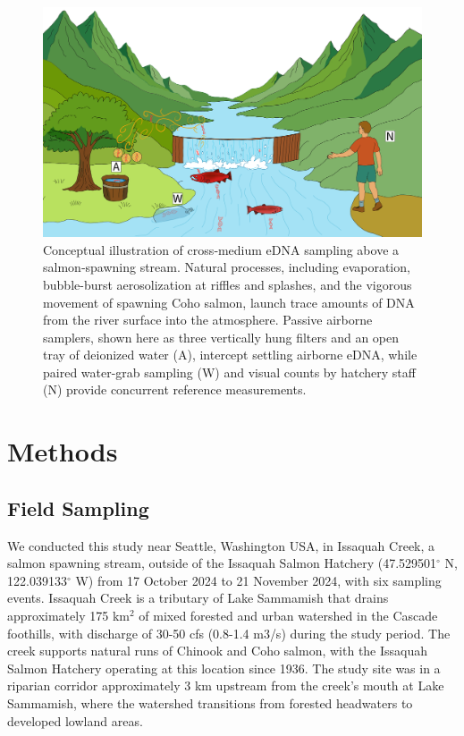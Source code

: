 \documentclass{article}
\begin{document}
\begin{figure}[tbhp] 
\centering
\includegraphics[width=13.5cm]{../../Plots/Figure_1.pdf}  
\caption{Conceptual illustration of cross‐medium eDNA sampling above a salmon‐spawning stream. Natural processes, including evaporation, bubble-burst aerosolization at riffles and splashes, and the vigorous movement of spawning Coho salmon, launch trace amounts of DNA from the river surface into the atmosphere. Passive airborne samplers, shown here as three vertically hung filters and an open tray of deionized water (A), intercept settling airborne eDNA, while paired water-grab sampling (W) and visual counts by hatchery staff (N) provide concurrent reference measurements.}
\label{fig:AI_physical_model}
\end{figure}

\section{Methods}

\subsection{Field Sampling}

We conducted this study near Seattle, Washington USA, in Issaquah Creek, a salmon spawning stream, outside of the Issaquah Salmon Hatchery (47.529501$^\circ$ N, 122.039133$^\circ$ W) from 17 October 2024 to 21 November 2024, with six sampling events. Issaquah Creek is a tributary of Lake Sammamish that drains approximately 175 km$^2$ of mixed forested and urban watershed in the Cascade foothills, with discharge of 30-50 cfs (0.8-1.4 m$3$/s) during the study period. The creek supports natural runs of Chinook and Coho salmon, with the Issaquah Salmon Hatchery operating at this location since 1936. The study site was in a riparian corridor approximately 3 km upstream from the creek's mouth at Lake Sammamish, where the watershed transitions from forested headwaters to developed lowland areas.
\end{document}
